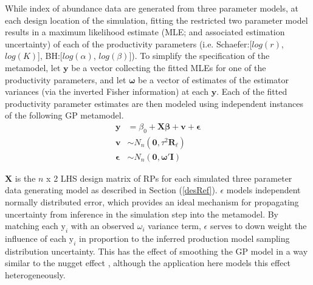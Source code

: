 %
While index of abundance data are generated from three parameter models, at each 
design location of the simulation, fitting the restricted two parameter model 
results in a maximum likelihood estimate (MLE; and associated estimation 
uncertainty) of each of the productivity parameters
(i.e. Schaefer:[$log(r)$, $log(K)$], BH:[$log(\alpha)$, $log(\beta)$]).
To simplify the specification of the metamodel, let $\textbf{y}$ be a vector 
collecting the fitted MLEs for one of the productivity parameters, and let 
$\bm{\omega}$ be a vector of estimates of the estimator variances (via the 
inverted Fisher information) at each $\textbf{y}$.
%
Each of the fitted productivity parameter estimates are then modeled using 
independent instances of the following GP metamodel. %
\begin{align} \label{GPModel}
	\textbf{y} &= \beta_0 + \bm{X}\bm{\beta} + \bm{v} + \bm{\epsilon} \nonumber \\
	\bm{v} &\sim N_n(\bm{0}, \tau^2 \bm{R_{\ell}}) \\
	\bm{\epsilon} &\sim N_n(\bm{0}, \bm{\omega}'\bm{I}) \nonumber
\end{align}
%

$\bm{X}$ is the $n$ x 2 LHS design matrix of RPs for each simulated %
three parameter data generating model as described in Section (\ref{desRef}). 
$\epsilon$ models independent normally distributed error, which provides an 
ideal mechanism for propagating uncertainty from inference in the simulation 
step into the metamodel. By matching each $\text{y}_i$ with an observed $\omega_i$ 
variance term, $\epsilon$ serves to down weight the influence of each $\text{y}_i$ 
in proportion to the inferred production model sampling distribution 
uncertainty. This has the effect of smoothing the GP model in a way similar to 
the nugget effect , although the application 
here models this effect heterogeneously.


